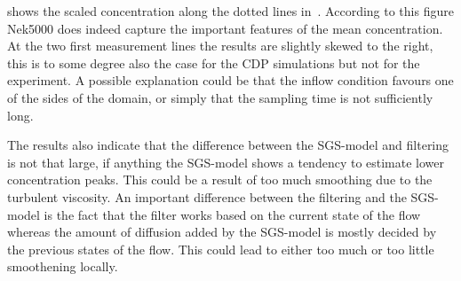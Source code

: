  shows the scaled concentration along the dotted lines in~. 
According to this figure Nek5000 does indeed capture the important features of the mean concentration.
At the two first measurement lines the results are slightly skewed to the right, this is to some degree 
also the case for the CDP simulations but not for the experiment. A possible explanation could be that 
the inflow condition favours one of the sides of the domain, or simply that the sampling time is not 
sufficiently long. 

The results also indicate that the difference between the SGS-model and filtering
is not that large,
if anything the SGS-model shows a tendency to estimate lower concentration peaks. This could be a 
result of too much smoothing due to the turbulent viscosity. An important difference between the 
filtering and the SGS-model is the fact that the filter works based on the current state of the flow 
whereas the amount of diffusion added by the SGS-model is mostly decided by the previous states of the 
flow. This could lead to either too much or too little smoothening locally.

